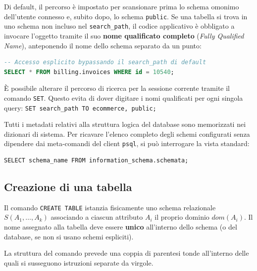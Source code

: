 Di default, il percorso è impostato per scansionare prima lo schema omonimo dell'utente connesso e, subito dopo, lo schema \texttt{public}. Se una tabella si trova in uno schema non incluso nel \texttt{search\_path}, il codice applicativo è obbligato a invocare l'oggetto tramite il suo \textbf{nome qualificato completo} (\textit{Fully Qualified Name}), anteponendo il nome dello schema separato da un punto:

\begin{lstlisting}[language=SQL, title=Utilizzo dei Nomi Qualificati]
-- Accesso esplicito bypassando il search_path di default
SELECT * FROM billing.invoices WHERE id = 10540;
\end{lstlisting}

\begin{tip}
È possibile alterare il percorso di ricerca per la sessione corrente tramite il comando \texttt{SET}. Questo evita di dover digitare i nomi qualificati per ogni singola query:
\texttt{SET search\_path TO ecommerce, public;}
\end{tip}

\begin{dettagli}
Tutti i metadati relativi alla struttura logica del database sono memorizzati nei dizionari di sistema. Per ricavare l'elenco completo degli schemi configurati senza dipendere dai meta-comandi del client \texttt{psql}, si può interrogare la vista standard:
\begin{verbatim}
SELECT schema_name FROM information_schema.schemata;
\end{verbatim}
\end{dettagli}

\subsection{Creazione di una tabella}
Il comando \texttt{CREATE TABLE} istanzia fisicamente uno schema relazionale $S(A_1, \dots, A_k)$ associando a ciascun attributo $A_i$ il proprio dominio $dom(A_i)$.
Il nome assegnato alla tabella deve essere \textbf{unico} all'interno dello schema (o del database, se non si usano schemi espliciti).

La struttura del comando prevede una coppia di parentesi tonde all'interno delle quali si susseguono istruzioni separate da virgole. 


